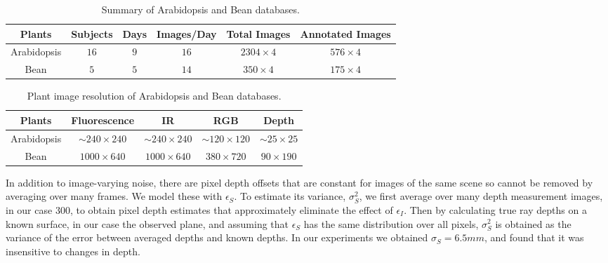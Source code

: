 \begin{table*}[t!]
\begin{center}
\caption{Summary of Arabidopsis and Bean databases.}
\label{tab:stat}
\begin{tabular}{c|c|c|c|c|c}
\hline
Plants & Subjects & Days & Images/Day & Total Images & Annotated Images \\
\hline
Arabidopsis & $16$ & $9$ & $16$ & $2304\times 4$ & $576\times 4$ \\
\hline
Bean & $5$ & $5$ & $14$ & $350\times 4$ & $175\times 4$ \\
\hline
\end{tabular}
\end{center}
\end{table*}



\begin{table*}
\begin{center}
\caption{Plant image resolution of Arabidopsis and Bean databases.}
\label{tab:resolution}
\begin{tabular}{c|c|c|c|c}
\hline
Plants & Fluorescence & IR & RGB & Depth \\
\hline
Arabidopsis & $\sim$$240\times240$ & $\sim$$240\times240$ & $\sim$$120\times120$ & $\sim$$25\times25$ \\
Bean & $1000\times640$ & $1000\times640$ & $380\times720$ & $90\times190$ \\
\hline
\end{tabular}
\end{center}
\end{table*}

In addition to image-varying noise, there are pixel depth offsets that are constant for images of the same scene so cannot be removed by averaging over many frames. We model these with $\epsilon_S$. To estimate its variance, $\sigma_S^2$, we first average over many depth measurement images, in our case 300, to obtain pixel depth estimates that approximately eliminate the effect of $\epsilon_I$. Then by calculating true ray depths on a known surface, in our case the observed plane, and assuming that $\epsilon_S$ has the same distribution over all pixels, $\sigma_S^2$ is obtained as the variance of the error between averaged depths and known depths. In our experiments we obtained $\sigma_S=6.5mm$, and found that it was insensitive to changes in depth.



